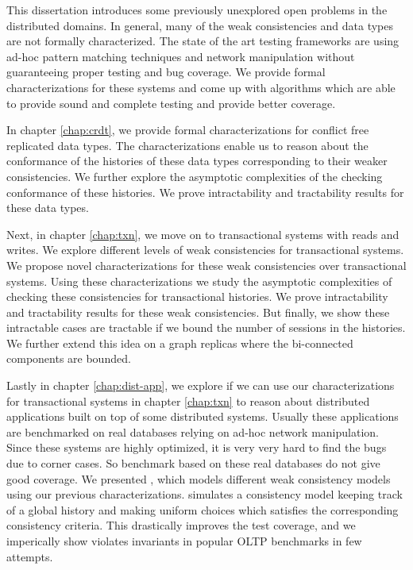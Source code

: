 
This dissertation introduces some previously unexplored open problems in the distributed domains. In general, many of the weak consistencies and data types are not formally characterized. The state of the art testing frameworks are using ad-hoc pattern matching techniques and network manipulation without guaranteeing proper testing and bug coverage. We provide formal characterizations for these systems and come up with algorithms which are able to provide sound and complete testing and provide better coverage.

In chapter \ref{chap:crdt}, we provide formal characterizations for conflict free replicated data types. The characterizations enable us to reason about the conformance of the histories of these data types corresponding to their weaker consistencies. We further explore the asymptotic complexities of the checking conformance of these histories. We prove intractability and tractability results for these data types.

Next, in chapter \ref{chap:txn}, we move on to transactional systems with reads and writes. We explore different levels of weak consistencies for transactional systems. We propose novel characterizations for these weak consistencies over transactional systems. Using these characterizations we study the asymptotic complexities of checking these consistencies for transactional histories. We prove intractability and tractability results for these weak consistencies. But finally, we show these intractable cases are tractable if we bound the number of sessions in the histories. We further extend this idea on a graph replicas where the bi-connected components are bounded.

Lastly in chapter \ref{chap:dist-app}, we explore if we can use our characterizations for transactional systems in chapter \ref{chap:txn} to reason about distributed applications built on top of some distributed systems. Usually these applications are benchmarked on real databases relying on ad-hoc network manipulation. Since these systems are highly optimized, it is very very hard to find the bugs due to corner cases. So benchmark based on these real databases do not give good coverage. We presented \tool{}, which models different weak consistency models using our previous characterizations. \tool{} simulates a consistency model keeping track of a global history and making uniform choices which satisfies the corresponding consistency criteria. This drastically improves the test coverage, and we imperically show \tool{} violates invariants in popular OLTP benchmarks in few attempts.

